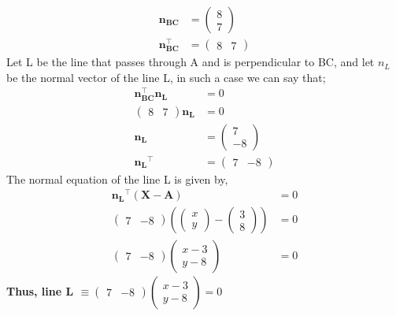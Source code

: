 \documentclass[journal,12pt,twocolumn]{IEEEtran}
\let\vec\mathbf
\newcommand{\myvec}[1]{\ensuremath{\begin{pmatrix}#1\end{pmatrix}}}
\begin{document}
\begin{enumerate}
\begin{align}
	\vec{n_{BC}} &= \myvec{8 \\ 7}
	\\
	\vec{n_{BC}^{\top}} &= \myvec{8 & 7}
    \end{align}
     Let L be the line that passes through A and is perpendicular to BC, and let $n_L$ be the normal vector of the line L, in such a case we can say that;
     \begin{align}
	\vec{n_{BC}^{\top}} \vec{n_L} &= 0
	\\
	\myvec{8 & 7}\vec{n_L} &= 0
	\\
	\vec{n_L} &= \myvec{7 \\ -8}
	\\
	\vec{n_L}^{\top} &= \myvec{7 & -8}
    \end{align}
    The normal equation of the line L is given by, 
    \begin{align}
	\vec{n_L}^{\top}(\vec{X} - \vec{A}) &= 0
	\\
	\myvec{7 & -8}(\myvec{x \\ y} - \myvec{3 \\ 8})&= 0
	\\
	\myvec{7 & -8}\myvec{x - 3 \\ y - 8} &= 0
    \end{align}
    \textbf{Thus, line L $\equiv \myvec{7 & -8}\myvec{x - 3 \\ y - 8} = 0$}
\end{enumerate}
\end{document}
